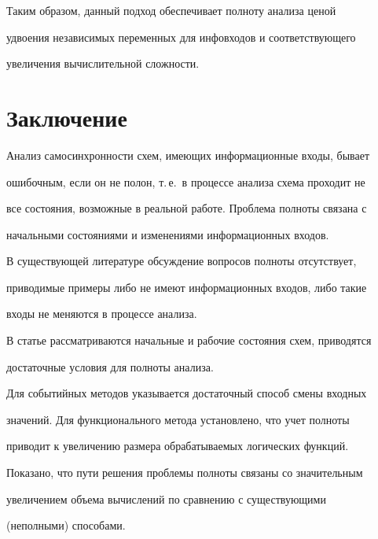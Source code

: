 Таким образом, данный подход обеспечивает полноту анализа ценой 


удвоения независимых переменных для инфовходов и соответствующего 


увеличения вычислительной сложности.





\section{Заключение}





Анализ самосинхронности схем, имеющих информационные входы, бывает 


ошибочным, если он не полон, т.\,е.\ в процессе анализа схема проходит не 


все состояния, возможные в реальной работе. Проблема полноты связана с 


начальными состояниями и изменениями информационных входов.





В существующей литературе обсуждение вопросов полноты отсутствует, 


приводимые примеры либо не имеют информационных входов, либо такие 


входы не меняются в процессе анализа.





В статье рассматриваются начальные и рабочие состояния схем, приводятся 


достаточные условия для полноты анализа.





Для событийных методов указывается  достаточный способ смены входных 


значений. Для функционального метода установ\-ле\-но, что учет полноты 


приводит к увеличению размера обрабатываемых логических функций.





Показано, что пути решения проблемы полноты связаны со значительным 


увеличением объема вычислений по сравнению с существующими 


(неполными) способами.






